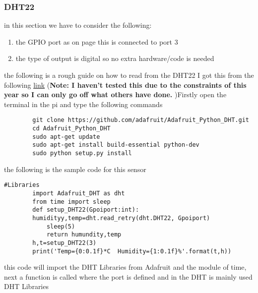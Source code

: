 	\subsubsection{DHT22}
	in this section we have to consider the following: 
	\begin{enumerate}
		\item the GPIO port as on page \pageref{Sychematic for DHT22 revised} this is connected to port 3 
		\item the type of output is digital so no  extra hardware/code is needed
	\end{enumerate}
	the following is  a rough guide on how to read from the DHT22 I got this from the following \href{https://www.instructables.com/Raspberry-Pi-Tutorial-How-to-Use-the-DHT-22/}{link}
	(\textbf{Note: I haven't tested this due to the constraints of this year so I can only go off what others have done.} )Firstly open the terminal in the pi and
	type the following commands
	\begin{verbatim}
		git clone https://github.com/adafruit/Adafruit_Python_DHT.git
		cd Adafruit_Python_DHT
		sudo apt-get update
		sudo apt-get install build-essential python-dev
		sudo python setup.py install

	\end{verbatim}
	\newpage
	the following is the sample code  for this sensor 
	\begin{lstlisting}[style=mystyle,caption={Example code for DHT2}]
		#Libraries
		import Adafruit_DHT as dht
		from time import sleep
		def setup_DHT22(Gpoiport:int):
		humidityy,temp=dht.read_retry(dht.DHT22, Gpoiport)
			sleep(5)
			return humundity,temp
		h,t=setup_DHT22(3)
		print('Temp={0:0.1f}*C  Humidity={1:0.1f}%'.format(t,h))
	\end{lstlisting}
	this code will  import the DHT Libraries from Adafruit and  the  module of time, next a function is called where the  port is defined and  in the DHT  is mainly used DHT Libraries 
	
